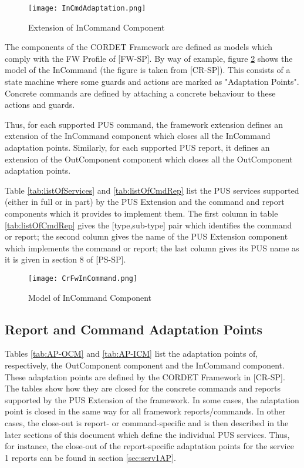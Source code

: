 \documentclass{pnp_article}
\begin{document}
\begin{figure}[H]
 \centering
 \texttt{[image: InCmdAdaptation.png]}
 \caption{Extension of InCommand Component}
 \label{fig:InCmdAdaptation}
\end{figure}

The components of the CORDET Framework are defined as models which comply with the FW Profile of [FW-SP]. By way of example, figure \ref{fig:CrFwInCommand} shows the model of the InCommand (the figure is taken from [CR-SP]). This consists of a state machine where some guards and actions are marked as "Adaptation Points". Concrete commands are defined by attaching a concrete behaviour to these actions and guards.

Thus, for each supported PUS command, the framework extension defines an extension of the InCommand component which closes all the InCommand adaptation points. Similarly, for each supported PUS report, it defines an extension of the OutComponent component which closes all the OutComponent adaptation points.

Table \ref{tab:listOfServices} and \ref{tab:listOfCmdRep} list the PUS services supported (either in full or in part) by the PUS Extension and the command and report components which it provides to implement them. The first column in table \ref{tab:listOfCmdRep} gives the [type,sub-type] pair which identifies the command or report; the second column gives the name of the PUS Extension component which implements the command or report; the last column gives its PUS name as it is given in section 8 of [PS-SP]. 

\begin{figure}[H]
 \centering
 \texttt{[image: CrFwInCommand.png]}
 \caption{Model of InCommand Component}
 \label{fig:CrFwInCommand}
\end{figure}


\subsection{Report and Command Adaptation Points}\label{sec:repCmdAP}
Tables \ref{tab:AP-OCM} and \ref{tab:AP-ICM} list the adaptation points of, respectively, the OutComponent component and the InCommand component. These adaptation points are defined by the CORDET Framework in [CR-SP]. The tables show how they are closed for the concrete commands and reports supported by the PUS Extension of the framework. In some cases, the adaptation point is closed in the same way for all framework reports/commands. In other cases, the close-out is report- or command-specific and is then described in the later sections of this document which define the individual PUS services. Thus, for instance, the close-out of the report-specific adaptation points for the service 1 reports can be found in section \ref{sec:serv1AP}. 
\end{document}
